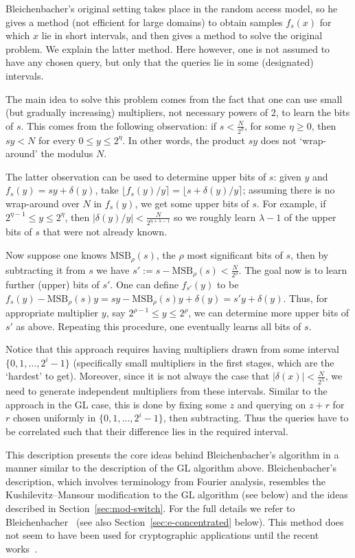 \documentclass[11pt]{article}
\theoremstyle{definition}
\newcommand{\MSB}{\text{MSB}}
\begin{document}
Bleichenbacher's original setting takes place in the random access model, so he gives a method (not efficient for large domains) to obtain samples $f_s(x)$ for which $x$ lie in short intervals, and then gives a method to solve the original problem. We explain the latter method.
Here however, one is not assumed to have any chosen query, but only that the queries lie in some (designated) intervals.

The main idea to solve this problem comes from the fact that one can use small (but gradually increasing) multipliers, not necessary powers of $2$, to learn the bits of $s$. This comes from the following observation: if $s < \frac{N}{2^\eta}$, for some $\eta \geq 0$, then $s y < N$ for every $0\leq y \leq 2^\eta$. In other words, the product $sy$ does not `wrap-around' the modulus $N$.

The latter observation can be used to determine upper bits of $s$: given $y$ and $f_s(y) = sy+\delta(y)$, take $\lfloor f_s(y)/y \rceil = \lfloor s + \delta(y)/y\rceil$; assuming there is no wrap-around over $N$ in $f_s(y)$, we get some upper bits of $s$. For example, if $2^{\eta-1}\leq y \leq 2^\eta$, then $|\delta(y)/y| < \frac{N}{2^{\eta+\lambda-1}}$ so we roughly learn $\lambda-1$ of the upper bits of $s$ that were not already known.

Now suppose one knows $\MSB_\rho(s)$, the $\rho$ most significant bits of $s$, then by subtracting it from $s$ we have $s' := s-\MSB_\rho(s) < \frac{N}{2^\rho}$. The goal now is to learn further (upper) bits of $s'$. One can define $f_{s'}(y)$ to be $f_s(y) - \MSB_\rho(s) y = sy - \MSB_\rho(s)y + \delta(y) = s' y + \delta(y)$. Thus, for appropriate multiplier $y$, say $2^{\rho-1}\leq y \leq 2^\rho$, we can determine more upper bits of $s'$ as above. Repeating this procedure, one eventually learns all bits of $s$.

Notice that this approach requires having multipliers drawn from some interval  $\{0, 1, \ldots, 2^i - 1\}$ (specifically small multipliers in the first stages, which are the `hardest' to get). Moreover, since it is not always the case that $|\delta(x)| < \frac{N}{2^\lambda}$, we need to generate independent multipliers from these intervals. Similar to the approach in the GL case, this is done by fixing some $z$ and querying on $z+r$ for $r$ chosen uniformly in $\{0, 1, \ldots, 2^i - 1\}$, then subtracting. Thus the queries have to be correlated such that their difference lies in the required interval.

This description presents the core ideas behind Bleichenbacher's algorithm in a manner similar to the description of the GL algorithm above. Bleichenbacher's description, which involves terminology from Fourier analysis, resembles the Kushilevitz--Mansour modification to the GL algorithm (see below) and the ideas described in Section~\ref{sec:mod-switch}. For the full details we refer to Bleichenbacher~\cite{Bleichenbacher} (see also Section~\ref{sec:e-concentrated} below).
This method does not seem to have been used for cryptographic applications until the recent works~\cite{De-Mulder,GLV/GLS}.
\end{document}

